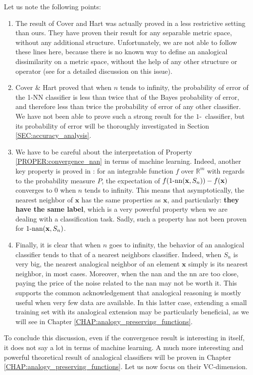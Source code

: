 Let us note the following points:
\begin{enumerate}
\item The result of Cover and Hart was actually proved in a less restrictive
  setting than ours. They have proven their result for any separable metric
    space, without any additional structure. Unfortunately, we are not able to
    follow these lines here, because there is no known way to define an
    analogical dissimilarity on a metric space, without the help of any other
    structure or operator (see \cite{MicBayDelJAIR08} for a detailed discussion
    on this issue).
  \item Cover \& Hart proved that when $n$ tends to infinity, the probability
    of error of the 1-NN classifier is less than twice that of the Bayes
    probability of error, and therefore less than twice the probability of error of
    any other classifier. We have not been able to prove such a strong result
    for the $1$-\NAN~classifier, but its probability of error will be thoroughly
    investigated in Section \ref{SEC:accuracy_analysis}.
  \item We have to be careful about the interpretation of Property
    \ref{PROPER:convergence_nan} in terms of machine learning. Indeed, another
    key property is proved in \cite{CovHarTIT67}: for an integrable
    function $f$  over $\mathbb{R}^m$ with regards to the probability measure $P$, the
    expectation of $f(1\mbox{-nn}(\mathbf{x},S_n))- f(\mathbf{x})$ converges to 0 when
    $n$ tends to infinity.  This means that asymptotically, the nearest
    neighbor of $\mathbf{x}$ has the same properties as $\mathbf{x}$, and
    particularly: \textbf{they have the same label}, which is a very powerful
    property when we are dealing with a classification task. Sadly, such a
    property has not been proven for $1\text{-nan}(\mathbf{x}, S_n)$.
\item Finally, it is clear that when $n$ goes to infinity, the behavior of an
  analogical classifier tends to that of a nearest neighbors classifier.
    Indeed, when $S_n$ is very big, the nearest analogical neighbor of an
    element $\mathbf{x}$ simply is its nearest neighbor, in most cases.
    Moreover, when the nan and the nn are too close, paying the price of the
    noise related to the nan may not be worth it. This supports the common
    acknowledgement that analogical reasoning is mostly useful when very few
    data are available.  In this latter case, extending a small training set with
    its analogical extension may be particularly beneficial, as we will see in
    Chapter \ref{CHAP:analogy_preserving_functions}.

\end{enumerate}
To conclude this discussion, even if the convergence result is interesting in
itself, it does not say a lot in terms of machine learning. A much more
interesting and powerful theoretical result of analogical classifiers will be
proven in Chapter \ref{CHAP:analogy_preserving_functions}. Let us now focus on
their VC-dimension.

